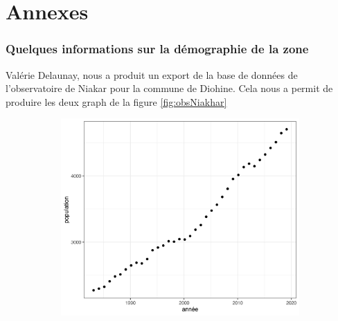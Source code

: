 \part*{Annexes}

\section{Quelques informations sur la démographie de la zone}

Valérie Delaunay, nous a produit un export de la base de données de l'observatoire de Niakar pour la commune de Diohine. Cela nous a permit de produire les deux graph de la figure \ref{fig:obsNiakhar}

\begin{figure}
     \centering
     \begin{subfigure}[b]{0.45\textwidth}
         \centering
         \includegraphics[width=\textwidth]{img/population1995-2020_diohine.png}
         \caption{}
         \label{fig:pop}
     \end{subfigure}
     \hfill
     \begin{subfigure}[b]{0.45\textwidth}
         \centering

\end{subfigure}
\end{figure}
